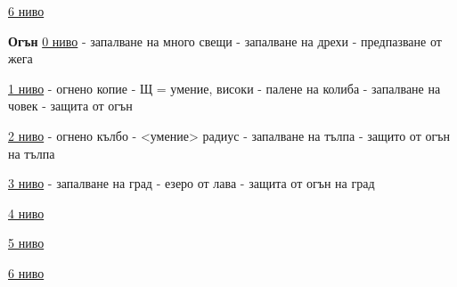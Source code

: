 \underline{6 ниво}



\textbf{Огън}
\underline{0 ниво}
- запалване на много свещи
- запалване на дрехи
- предпазване от жега

\underline{1 ниво}
- огнено копие - Щ = умение, високи
- палене на колиба
- запалване на човек
- защита от огън

\underline{2 ниво}
- огнено кълбо - <умение> радиус
- запалване на тълпа
- защито от огън на тълпа

\underline{3 ниво}
- запалване на град
- езеро от лава
- защита от огън на град

\underline{4 ниво}

\underline{5 ниво}

\underline{6 ниво}








